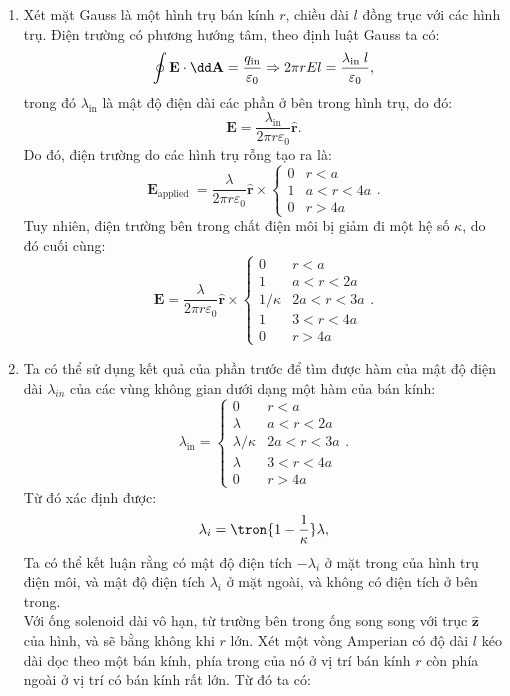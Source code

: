 \begin{loigiai}
\begin{enumerate}[1)]
    \item Xét mặt Gauss là một hình trụ bán kính $r$, chiều dài $l$ đồng trục với các hình trụ. Điện trường có phương hướng tâm, theo định luật Gauss ta có:
$$
\oint \mathbf{E} \cdot \dd \mathbf{A}=\dfrac{q_{\text{in}}}{\varepsilon_{0}} \Rightarrow 2 \pi r E l=\dfrac{\lambda_{\text {\text{in} }} l}{\varepsilon_{0}},
$$
trong đó $\lambda_{\mathrm{in}}$ là mật độ điện dài các phần ở bên trong hình trụ, do đó:
$$\mathbf{E}=\dfrac{\lambda_{\mathrm{in}}}{2\pi r\varepsilon_0}\hat{\mathbf{r}}.$$
Do đó, điện trường do các hình trụ rỗng tạo ra là:
$$
\mathbf{E}_{\text {applied }}=\dfrac{\lambda}{2 \pi r \varepsilon_{0}} \hat{\mathbf{r}} \times \begin{cases}0 & r<a \\ 1 & a<r<4 a \\ 0 & r>4 a\end{cases}.
$$
Tuy nhiên, điện trường bên trong chất điện môi bị giảm đi một hệ số $\kappa$, do đó cuối cùng:
$$
\mathbf{E}=\frac{\lambda}{2 \pi r \varepsilon_{0}} \hat{\mathbf{r}} \times \begin{cases}0 & r<a \\ 1 & a<r<2 a \\ 1 / \kappa & 2 a<r<3 a \\ 1 & 3<r<4 a \\ 0 & r>4 a \end{cases}.
$$
\item Ta có thể sử dụng kết quả của phần trước để tìm được hàm của mật độ điện dài $\lambda_{in}$ của các vùng không gian dưới dạng một hàm của bán kính:
$$
\lambda_{\mathrm{in}}= \begin{cases}0 & r<a \\ \lambda & a<r<2 a \\ \lambda / \kappa & 2 a<r<3 a \\ \lambda & 3<r<4 a \\ 0 & r>4 a\end{cases}.
$$
Từ đó xác định được:
$$\lambda_i=\tron{1-\dfrac{1}{\kappa}}\lambda,$$ 
Ta có thể kết luận rằng có mật độ điện tích $-\lambda_i$ ở mặt trong của hình trụ điện môi, và mật độ điện tích $\lambda_i$ ở mặt ngoài, và không có điện tích ở bên trong.\\
Với ống solenoid dài vô hạn, từ trường bên trong ống song song với trục $\hat{\mathbf{z}}$ của hình, và sẽ bằng không khi $r$ lớn. Xét một vòng Amperian có độ dài $l$ kéo dài dọc theo một bán kính, phía trong của nó ở vị trí bán kính $r$ còn phía ngoài ở vị trí có bán kính rất lớn. Từ đó ta có:

\end{enumerate}
\end{loigiai}
